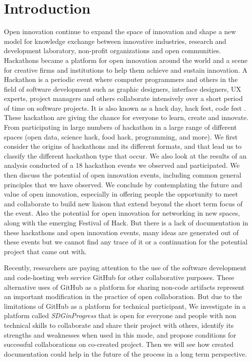 \section{Introduction}
Open innovation continue to expand the space of innovation and shape a new model for knowledge exchange between innovative industries, research and development laboratory, non-profit organizations and open communities. Hackathons became a platform for open innovation around the world and a scene for creative firms and institutions to help them achieve and sustain innovation. A Hackathon is a periodic event where computer programmers and others in the field of software development such as graphic designers, interface designers, UX experts, project managers and others collaborate intensively over a short period of time on software projects. It is also known as a hack day, hack fest, code fest \cite{wiki:hackathon}. These hackathon are giving the chance for everyone to learn, create  and innovate. From participating in large numbers of hackathon in a large range of different spaces (open data, science hack, food hack, programming, and more). We first consider the origins of hackathons and its different formats, and that lead us to classify the different hackathon type that occur. We also look at the results of an analysis conducted of a 18 hackathon events we observed and participated. We then discuss the potential of open innovation events, including common general principles that we have observed. We conclude by contemplating the future and value of open innovation, especially in offering people the opportunity to meet and collaborate to build new liaison that extend beyond the short term focus of the event. Also the potential for open innovation for networking in new spaces, along with the emerging Festival of Hack. But there is a lack of documentation in these hackathons and open innovation events, many ideas are generated out of these events but we cannot find any trace of it or a continuation for the potential project that came out with.

Recently, researchers are paying attention to the use of the software development and code-hosting web service GitHub for other collaborative purposes. These alternative uses of GitHub as a platform for sharing non-code artifacts represent an important modification in the practice of open collaboration\cite{longo2015use}. But due to the limitations of GitHub as a platform for technical participant, We investigate in a platform called \textit{SDGinProgress} that is open for everyone and people with non technical skills to collaborate and share their project with others, identify its strengths and weaknesses when used in this mode, and propose conditions for successful collaborations on co-created project. Then we will see how created documentation could help in the future of the process in a long term perspective.

